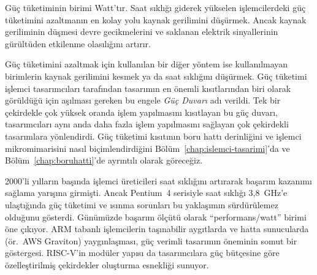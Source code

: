 Güç tüketiminin birimi Watt'tır. Saat sıklığı giderek yükselen işlemcilerdeki güç tüketimini azaltmanın en kolay yolu kaynak gerilimini düşürmek. Ancak kaynak geriliminin düşmesi devre gecikmelerini ve saklanan elektrik sinyallerinin gürültüden etkilenme olasılığını artırır.

Güç tüketimini azaltmak için kullanılan bir diğer yöntem ise kullanılmayan birimlerin kaynak gerilimini kesmek ya da saat sıklığını düşürmek. Güç tüketimi işlemci tasarımcıları tarafından tasarımın en önemli kısıtlarından biri olarak görüldüğü için aşılması gereken bu engele \emph{Güç Duvarı} adı verildi. Tek bir çekirdekle çok yüksek oranda işlem yapılmasını kısıtlayan bu güç duvarı, tasarımcıları aynı anda daha fazla işlem yapılmasını sağlayan çok çekirdekli tasarımlara yönlendirdi. Güç tüketimi kısıtının boru hattı derinliğini ve işlemci mikromimarisini nasıl biçimlendirdiğini Bölüm~\ref{chap:islemci-tasarimi}'da ve Bölüm~\ref{chap:boruhatti}'de ayrıntılı olarak göreceğiz.

\begin{bilginot}
2000'li yılların başında işlemci üreticileri saat sıklığını artırarak başarım kazanımı sağlama yarışına girmişti. Ancak Pentium~4 serisiyle saat sıklığı 3{,}8~GHz'e ulaştığında güç tüketimi ve ısınma sorunları bu yaklaşımın sürdürülemez olduğunu gösterdi. Günümüzde başarım ölçütü olarak ``performans/watt'' birimi öne çıkıyor. ARM tabanlı işlemcilerin taşınabilir aygıtlarda ve hatta sunucularda (ör.\ AWS Graviton) yaygınlaşması, güç verimli tasarımın öneminin somut bir göstergesi. RISC-V'in modüler yapısı da tasarımcılara güç bütçesine göre özelleştirilmiş çekirdekler oluşturma esnekliği sunuyor.
\end{bilginot}


